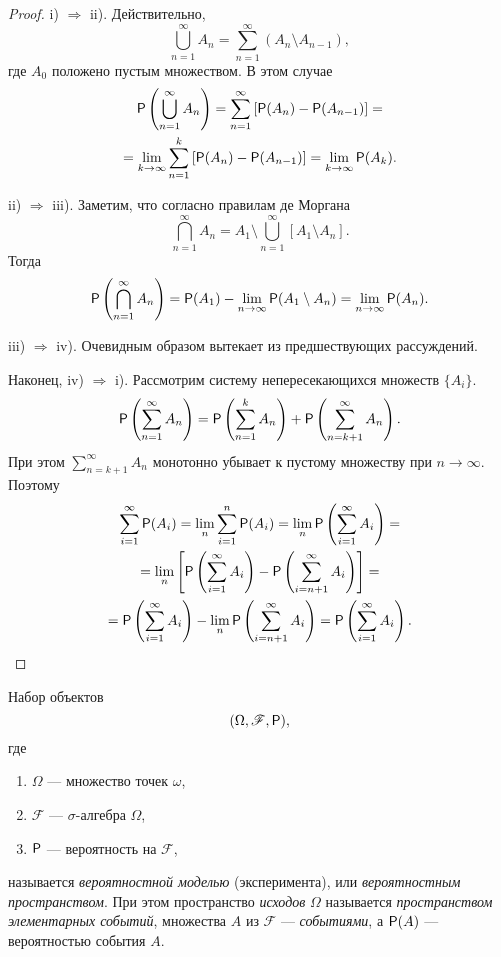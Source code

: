 \begin{proof}
i) $ \Rightarrow $ ii). Действительно, 
\[
	\bigcup_{n=1}^\infty A_n = \sum_{n=1}^\infty (A_n \setminus A_{n-1}),
\]
где $ A_0 $ положено пустым множеством. В этом случае 
\begin{multline*}
	\mathsf P \left( \bigcup_{n=1}^\infty A_n \right) = \sum_{n=1}^\infty \left[ \mathsf P(A_n) -
	\mathsf P(A_{n-1}) \right] =\\= \lim_{k\to\infty} \sum_{n=1}^k \left[ \mathsf P(A_n) -
\mathsf P(A_{n-1}) \right] = \lim_{k\to\infty} \mathsf P(A_k).
\end{multline*}

ii) $\Rightarrow$ iii). Заметим, что согласно правилам де Моргана
\[
	\bigcap_{n=1}^\infty A_n = A_1 \setminus \bigcup_{n=1}^\infty \left[ A_1 \setminus A_n
	\right].
\]
Тогда 
\[
	\mathsf P \left( \bigcap_{n=1}^\infty A_n \right) = \mathsf P(A_1) - \lim_{n\to\infty}
	\mathsf P(A_1 \setminus A_n) = \lim_{n\to\infty} \mathsf P(A_n).
\]

iii) $ \Rightarrow $ iv). Очевидным образом вытекает из предшествующих
рассуждений.

Наконец, iv) $ \Rightarrow $ i). Рассмотрим систему непересекающихся множеств $
\{A_i\}$.  
\[
	\mathsf P\left(\sum_{n=1}^\infty A_n\right) = \mathsf P \left( \sum_{n=1}^k A_n
	\right) + \mathsf P \left( \sum_{n=k+1}^\infty A_n \right).
\]
При этом $ \sum_{n=k+1}^\infty A_n $ монотонно убывает к пустому множеству при
$ n \to\infty $. Поэтому 
\begin{multline*}
	\sum_{i=1}^\infty \mathsf P(A_i) = \lim_n \sum_{i=1}^n \mathsf P(A_i) = \lim_n \mathsf P
	\left( \sum_{i=1}^\infty A_i \right) = \\ =
	\lim_n \left[ \mathsf P \left( \sum_{i=1}^\infty A_i \right) - \mathsf P \left(
	\sum_{i=n+1}^\infty A_i \right)  \right] =\\=
	\mathsf P \left( \sum_{i=1}^\infty A_i \right)  -\lim_n \mathsf P \left(
	\sum_{i=n+1}^\infty A_i \right) = \mathsf P \left( \sum_{i=1}^\infty A_i \right).
\end{multline*}


\end{proof}

\begin{definition}[основное]
	Набор объектов  
	\[
		(\Omega, \mathscr F, \mathsf P),
	\]
	где 
	\begin{enumerate}[label=\alph*)]
		\item $ \Omega $ --- множество точек $ \omega $,
		\item $ \mathscr F $ --- $ \sigma $-алгебра $ \Omega $,
		\item	$ \mathsf P $ --- вероятность на $ \mathscr F $,
	\end{enumerate}
	называется \emph{вероятностной моделью} (эксперимента), или
	\emph{вероятностным пространством}. При этом пространство \emph{исходов}
	$\Omega $ называется \emph{пространством элементарных событий}, множества $ A
	$ из $ \mathscr F $ --- \emph{событиями}, а $ \mathsf P(A) $ --- вероятностью
	события $ A $.
\end{definition} 
